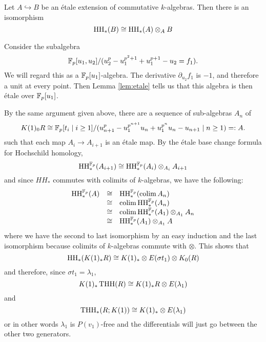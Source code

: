 \begin{thm}
	Let $A\hookrightarrow B$ be an \'etale extension of commutative $k$-algebras. Then there is an isomorphism
	\[
	\operatorname{HH}_*(B)\cong \operatorname{HH}_*(A)\otimes_A B
	\]
\end{thm}






\begin{ex}
	Consider the subalgebra
	\[
	\mathbb{F}_p[u_1,u_2]/(u_2^p-u_1^{p^2+1}+u_1^{p+1}-u_2=f_1).
	\]
	We will regard this as a $\mathbb{F}_p[u_1]$-algebra. The derivative $\partial_{u_2}f_1$ is $-1$, and therefore a unit at every point. Then Lemma \ref{lem:etale} tells us that this algebra is then \'etale over $\mathbb{F}_p[u_1]$. 
\end{ex} 


By the same argument given above, there are a sequence of sub-algebras $A_n$ of 
	\[
	K(1)_0 R\cong\mathbb{F}_p[t_i\mid i\geq 1]/(u_{n+1}^p-u_1^{p^{n+1}}u_n+u_1^{p^n}u_n-u_{n+1}\mid n\geq 1)=:A.
	\]
such that each map $A_i\rightarrow A_{i+1}$ is an \'etale map. By the \'etale base change formula for Hochschild homology, 
\[ \operatorname{HH}_*^{\mathbb{F}_p}(A_{i+1})\cong \operatorname{HH}_*^{\mathbb{F}_p}(A_i)\otimes_{A_i}A_{i+1}\]
and since $HH_*$ commutes with colimits of $k$-algebras, we have the following: 
	\[ 
	\begin{array}{rcl} 
		\operatorname{HH}_*^{\mathbb{F}_p}(A) & \cong &\operatorname{HH}_*^{\mathbb{F}_p}(\operatorname*{colim} A_n) \\
				         & \cong & \operatorname*{colim}  \operatorname{HH}_*^{\mathbb{F}_p}(A_n) \\
				         & \cong & \operatorname*{colim} \operatorname{HH}_*^{\mathbb{F}_p}(A_1)\otimes_{A_1}A_n \\
				         & \cong & \operatorname{HH}_*^{\mathbb{F}_p}(A_1)\otimes_{A_1}A \\
	\end{array}
	\]
where we have the second to last isomorphism by an easy induction and the last isomorphism because colimits of $k$-algebras commute with $\otimes$. 
This shows that 
\[ \operatorname{HH}_*(K(1)_*R)\cong K(1)_*\otimes E(\sigma t_1)\otimes K_0(R) \]
and therefore, since $\sigma t_1=\lambda_1$, 
\[ K(1)_*\operatorname{THH}(R)\cong K(1)_*R\otimes E(\lambda_1) \]
and 
\[ \operatorname{THH}_*(R;K(1))\cong K(1)_*\otimes E(\lambda_1) \]
or in other words $\lambda_1$ is $P(v_1)$-free and the differentials will just go between the other two generators. 
	
